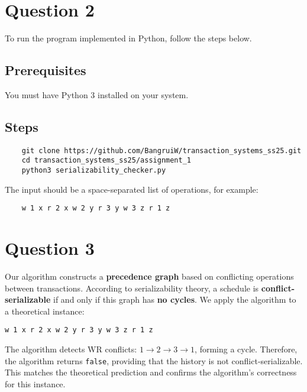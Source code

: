 \documentclass[a4paper,12pt]{article}
\begin{document}
\section*{Question 2}
To run the program implemented in Python, follow the steps below.

\subsection*{Prerequisites}
You must have Python 3 installed on your system.
\subsection*{Steps}
\begin{verbatim}
    git clone https://github.com/BangruiW/transaction_systems_ss25.git
    cd transaction_systems_ss25/assignment_1
    python3 serializability_checker.py
\end{verbatim}
The input should be a space-separated list of operations, for example:
\begin{verbatim}
    w 1 x r 2 x w 2 y r 3 y w 3 z r 1 z
\end{verbatim}


\section*{Question 3}

Our algorithm constructs a \textbf{precedence graph} based on conflicting operations between transactions. According to serializability theory, a schedule is \textbf{conflict-serializable} if and only if this graph has \textbf{no cycles}. We apply the algorithm to a theoretical instance:
\begin{center}
\texttt{w 1 x \quad r 2 x \quad w 2 y \quad r 3 y \quad w 3 z \quad r 1 z}
\end{center}
The algorithm detects WR conflicts: $1 \rightarrow 2 \rightarrow 3 \rightarrow 1$, forming a cycle. Therefore, the algorithm returns \texttt{false}, providing that the history is not conflict-serializable. This matches the theoretical prediction and confirms the algorithm's correctness for this instance.
\end{document}
